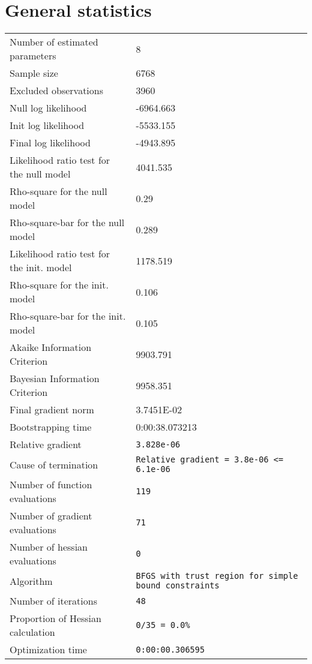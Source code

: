 \documentclass{article}
\begin{document}
\section{General statistics}
\begin{tabular}{ll}
Number of estimated parameters & 8 \\
Sample size & 6768 \\
Excluded observations & 3960 \\
Null log likelihood & -6964.663 \\
Init log likelihood & -5533.155 \\
Final log likelihood & -4943.895 \\
Likelihood ratio test for the null model & 4041.535 \\
Rho-square for the null model & 0.29 \\
Rho-square-bar for the null model & 0.289 \\
Likelihood ratio test for the init. model & 1178.519 \\
Rho-square for the init. model & 0.106 \\
Rho-square-bar for the init. model & 0.105 \\
Akaike Information Criterion & 9903.791 \\
Bayesian Information Criterion & 9958.351 \\
Final gradient norm & 3.7451E-02 \\
Bootstrapping time & 0:00:38.073213 \\
Relative gradient & \verb$3.828e-06$ \\
Cause of termination & \verb$Relative gradient = 3.8e-06 <= 6.1e-06$ \\
Number of function evaluations & \verb$119$ \\
Number of gradient evaluations & \verb$71$ \\
Number of hessian evaluations & \verb$0$ \\
Algorithm & \verb$BFGS with trust region for simple bound constraints$ \\
Number of iterations & \verb$48$ \\
Proportion of Hessian calculation & \verb$0/35 = 0.0%$ \\
Optimization time & \verb$0:00:00.306595$ \\
\end{tabular}
\end{document}
